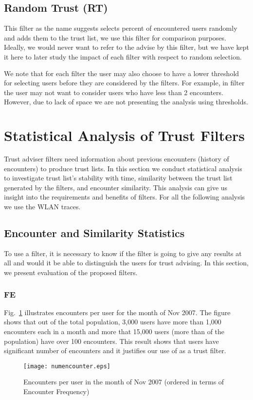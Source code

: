 \documentclass[10pt,conference]{IEEEtran}
\begin{document}
\subsection{Random Trust (RT)}
This filter as the name suggests selects  percent of encountered users randomly and adds them to the trust list, we use this filter for comparison purposes. Ideally, we would never want to refer to the advise by this filter, but we have kept it here to later study the impact of each filter with respect to random selection.

We note that for each filter  the user may also choose to have a lower threshold for selecting users before they are considered by the filters. For example, in  filter the user may not want to consider users who have less than 2 encounters. However, due to lack of space we are not presenting the analysis using thresholds.

\section{Statistical Analysis of Trust Filters} \label{stat_ana}
Trust adviser filters need information about previous encounters (history of encounters) to  produce trust lists. In this section we conduct statistical analysis to investigate trust list's stability with time, similarity between the trust list generated by the filters, and encounter similarity.  This analysis can give us insight into the requirements and benefits of filters. For all the following analysis we use the WLAN traces.

\subsection{Encounter and Similarity Statistics}

To use a filter, it is necessary to know if the filter is going to give any results at all and would it be able to distinguish the users for trust advising.  In this section, we present evaluation of the proposed filters.


\subsubsection{FE}
Fig.~\ref{fig:FE}  illustrates encounters per user for the month of Nov 2007. The figure shows that out of the total population, 3,000 users have more than 1,000 encounters each in a month and more that 15,000 users (more than  of the population) have over 100 encounters. This result shows that users have significant number of encounters and it justifies our use of  as a trust filter.  
\begin{figure}
\centering

\texttt{[image: numencounter.eps]} 
\caption{Encounters per user in the month of Nov 2007 (ordered in terms of Encounter Frequency)}
\label{fig:FE}
\end{figure}
\end{document}
